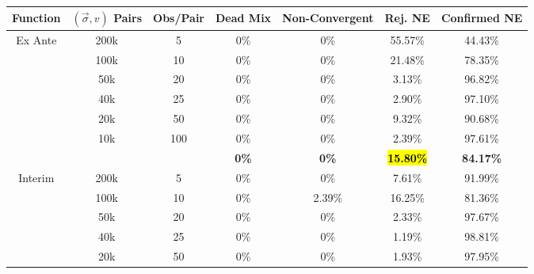 \begin{table}[ht]
\begin{tabular}{c|c|c|c|c|c|c}
\multicolumn{1}{c}{Function} & $(\vec{\sigma}, v)$ Pairs & Obs/Pair             & Dead Mix & Non-Convergent & Rej. NE      & Confirmed NE     \\
\hline
\multicolumn{1}{c}{Ex Ante}  & 200k                      & 5                    & 0\%           & 0\%              & 55.57\%          & 44.43\%          \\
                             & 100k                      & 10                   & 0\%           & 0\%              & 21.48\%          & 78.35\%          \\
                             & 50k                       & 20                   & 0\%           & 0\%              & 3.13\%           & 96.82\%          \\
                             & 40k                       & 25                   & 0\%           & 0\%              & 2.90\%           & 97.10\%          \\
                             & 20k                       & 50                   & 0\%           & 0\%              & 9.32\%           & 90.68\%          \\
                             & 10k                       & 100                  & 0\%           & 0\%              & 2.39\%           & 97.61\%          \\
\hline
                             & \multicolumn{1}{l}{}      & \multicolumn{1}{l}{} & \textbf{0\%}  & \textbf{0\%}     & \hl{\textbf{15.80\%}} & \textbf{84.17\%} \\
\hline
\multicolumn{1}{c}{Interim}  & 200k                      & 5                    & 0\%           & 0\%              & 7.61\%           & 91.99\%          \\
                             & 100k                      & 10                   & 0\%           & 2.39\%           & 16.25\%          & 81.36\%          \\
                             & 50k                       & 20                   & 0\%           & 0\%              & 2.33\%           & 97.67\%          \\
                             & 40k                       & 25                   & 0\%           & 0\%              & 1.19\%           & 98.81\%          \\
                             & 20k                       & 50                   & 0\%           & 0\%              & 1.93\%           & 97.95\%          \\

\end{tabular}
\end{table}
